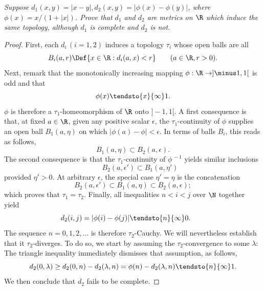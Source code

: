 \textit{Suppose %
%
  $d_1(x,y) = |x-y|, d_2(x,y) = |\phi(x) - \phi(y)|$, %
%
where %
%
  $\phi(x)={x}/{(1+\lvert x \rvert )}$. %
%
Prove that $d_1$ and $d_2$ are metrics on $\R$ which induce the same %
topology, although $d_1$ is complete and $d_2$ is not.
}
%
\begin{proof}%
First, each $d_i\, (i=1, 2)$ induces a topology $\tau_i$ %
whose open balls are all %
%
\begin{equation}\label{1_12_2}
  B_i(a,r) \Def \{x \in \R: d_i (a, x) < r \} 
  \qquad (a \in \R, r > 0 ).
\end{equation}
%
Next, remark that the monotonically increasing mapping %
$\phi: \R \to ]\minus 1, 1[$ is odd and that %
%
\begin{equation}\label{1_12_1}
  \phi(x) \tendsto{x}{\infty} 1.
\end{equation}
%
$\phi$ is therefore a $\tau_1$-homeomorphism of $\R$ onto $]\minus 1, 1[$. %
%
A first consequence is that, at fixed $a \in \R$, given any positive scalar %
$\epsilon$, the $\tau_1$-continuity of $\phi$ supplies an open ball %
$B_1(a,\eta)$ on which $|\phi(a)-\phi|<\epsilon$. %
In terms of balls $B_i$, this reads as follows, %
%
\begin{equation}
  B_1(a,\eta) \subset B_2(a,\epsilon).
\end{equation}
%
The second consequence is that the $\tau_1$-continuity of %
$\phi^{\, \minus 1}$ yields similar inclusions %
%
\begin{equation} \label{1_12_6}
\qquad B_2(a, \epsilon') \subset B_1 (a, \eta')
\end{equation}
%
provided $\eta'>0$. At arbitrary $\epsilon$, the special case $\eta' = \eta$ %
is the concatenation %
%
\begin{equation}
  B_2(a, \epsilon') \subset B_1(a,\eta) \subset B_2(a,\epsilon); 
\end{equation}
%
which proves that $\tau_1 =\tau_2$. %
%
Finally, all inequalities $n < i < j$ over $\N$ together yield %
%
\begin{equation}
  d_2(i, j)=|\phi(i)-\phi(j)| \tendsto{n}{\infty} 0.
\qquad \end{equation}
%
The sequence $n=0, 1, 2, \dots$ is therefore $\tau_2$-Cauchy. We will %
nevertheless establish that it $\tau_2$-diverges. To do so, we start by %
assuming the $\tau_2$-convergence to some $\lambda$: %
The triangle inequality immediately dismisses that assumption, as follows, %
%
\begin{equation}
  d_2(0, \lambda) \geq 
  d_2(0, n) - d_2(\lambda, n) = 
  \phi(n) -d_2(\lambda, n)  \tendsto{n}{\infty} 1.
\end{equation}
%
We then conclude that $d_2$ fails to be complete. 
\end{proof}
